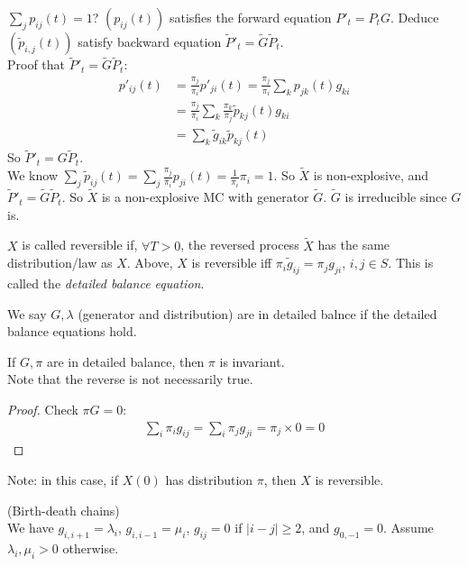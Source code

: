 \documentclass[a4paper]{article}
\begin{document}
$\sum_j p_{ij}(t) = 1$? $(p_{ij}(t))$ satisfies the forward equation $P'_t = P_t G$. Deduce $(\tilde{p}_{i,j}(t))$ satisfy backward equation $\tilde{P}'_t = \tilde{G}\tilde{P}_t$.\\
Proof that $\tilde{P}'_t = \tilde{G} \tilde{P}_t$:
\begin{equation*}
\begin{aligned}
p'_{ij}(t) &= \frac{\pi_j}{\pi_i} p'_{ji}(t) = \frac{\pi_j}{\pi_i} \sum_k p_{jk}(t) g_{ki}\\
&= \frac{\pi_j}{\pi_i} \sum_k \frac{\pi_k}{\pi_j}\tilde{p}_{kj}(t) g_{ki}\\
&= \sum_k \tilde{g}_{ik} \tilde{p}_{kj} (t)
\end{aligned}
\end{equation*}
So $\tilde{P}'_t = G\tilde{P}_t$.\\
We know $\sum_j \tilde{p}_{ij}(t) = \sum_j \frac{\pi_j}{\pi_i} p_{ji}(t) = \frac{1}{\pi_i}\pi_i = 1$. So $\tilde{X}$ is non-explosive, and $\tilde{P}'_t = \tilde{G}\tilde{P}_t$. So $\tilde{X}$ is a non-explosive MC with generator $\tilde{G}$. $\tilde{G}$ is irreducible since $G$ is.

\begin{defi}
$X$ is called reversible if, $\forall T>0$, the reversed process $\tilde{X}$ has the same distribution/law as $X$. Above, $X$ is reversible iff $\pi_i \tilde{g}_{ij} = \pi_j g_{ji}$, $i,j \in S$. This is called the \emph{detailed balance equation}.

We say $G,\lambda$ (generator and distribution) are in detailed balnce if the detailed balance equations hold.
\end{defi}

\begin{thm}
If $G,\pi$ are in detailed balance, then $\pi$ is invariant.\\
Note that the reverse is not necessarily true.
\begin{proof}
Check $\pi G = 0$:
\begin{equation*}
\begin{aligned}
\sum_i \pi_i g_{ij} = \sum_i \pi_j g_{ji} = \pi_j \times 0 = 0
\end{aligned}
\end{equation*}
\end{proof}
Note: in this case, if $X(0)$ has distribution $\pi$, then $X$ is reversible.
\end{thm}

\begin{eg} (Birth-death chains)\\
We have $g_{i,i+1} = \lambda_i$, $g_{i,i-1} = \mu_i$, $g_{ij} = 0$ if $|i-j| \geq 2$, and $g_{0,-1} =0$. Assume $\lambda_i,\mu_i > 0$ otherwise.\\
\end{eg}
\end{document}
